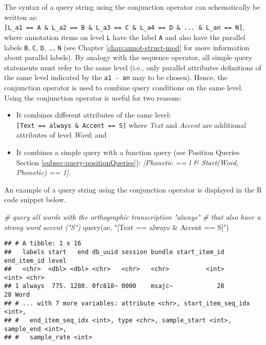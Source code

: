 \documentclass[
]{book}
\newenvironment{Shaded}{\begin{snugshade}}{\end{snugshade}}
\newcommand{\CommentTok}[1]{\textcolor[rgb]{0.56,0.35,0.01}{\textit{#1}}}
\newcommand{\FunctionTok}[1]{\textcolor[rgb]{0.00,0.00,0.00}{#1}}
\newcommand{\NormalTok}[1]{#1}
\newcommand{\StringTok}[1]{\textcolor[rgb]{0.31,0.60,0.02}{#1}}
\providecommand{\tightlist}{%
  \setlength{\itemsep}{0pt}\setlength{\parskip}{0pt}}
\begin{document}
The syntax of a query string using the conjunction operator can schematically be written as: \texttt{{[}L\_a1\ ==\ A\ \&\ L\_a2\ ==\ B\ \&\ L\_a3\ ==\ C\ \&\ L\_a4\ ==\ D\ \&\ ...\ \&\ L\_an\ ==\ N{]}}, where annotation items on level \texttt{L} have the label \texttt{A} and also have the parallel labels \texttt{B}, \texttt{C}, \texttt{D}, \ldots, \texttt{N} (see Chapter \ref{chap:annot-struct-mod} for more information about parallel labels). By analogy with the sequence operator, all simple query statements must refer to the same level (i.e., only parallel attributes definitions of the same level indicated by the \texttt{a1\ -\ an} may to be chosen). Hence, the conjunction operator is used to combine query conditions on the same level. Using the conjunction operator is useful for two reasons:

\begin{itemize}
\tightlist
\item
  It combines different attributes of the same level: \texttt{{[}Text\ ==\ always\ \&\ Accent\ ==\ S{]}} where \emph{Text} and \emph{Accent} are additional attributes of level \emph{Word}; and
\item
  It combines a simple query with a function query (see Position Queries Section \ref{subsec:query-positionQueries}): \emph{{[}Phonetic == l \& Start(Word, Phonetic) == 1{]}}.
\end{itemize}

An example of a query string using the conjunction operator is displayed in the R code snippet below.

\begin{Shaded}
\begin{Highlighting}[]
\CommentTok{\# query all words with the orthographic transcription "always"}
\CommentTok{\# that also have a strong word accent ("S")}
\FunctionTok{query}\NormalTok{(ae, }\StringTok{"[Text == always \& Accent == S]"}\NormalTok{)}
\end{Highlighting}
\end{Shaded}

\begin{verbatim}
## # A tibble: 1 x 16
##   labels start   end db_uuid session bundle start_item_id end_item_id level
##   <chr>  <dbl> <dbl> <chr>   <chr>   <chr>          <int>       <int> <chr>
## 1 always  775. 1280. 0fc618~ 0000    msajc~            28          28 Word 
## # ... with 7 more variables: attribute <chr>, start_item_seq_idx <int>,
## #   end_item_seq_idx <int>, type <chr>, sample_start <int>, sample_end <int>,
## #   sample_rate <int>
\end{verbatim}
\end{document}
